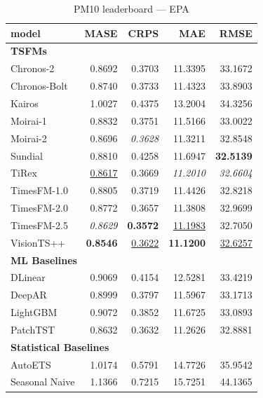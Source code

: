 \begin{table}[H]
\caption{PM10 leaderboard --- EPA}
\centering
\begin{small}
\begin{tabular}{lrrrr}
\toprule
model & MASE & CRPS & MAE & RMSE \\
\midrule
\multicolumn{5}{l}{\textbf{TSFMs}} \\
Chronos-2 & 0.8692 & 0.3703 & 11.3395 & 33.1672 \\
Chronos-Bolt & 0.8740 & 0.3733 & 11.4323 & 33.8903 \\
Kairos & 1.0027 & 0.4375 & 13.2004 & 34.3256 \\
Moirai-1 & 0.8832 & 0.3751 & 11.5166 & 33.0022 \\
Moirai-2 & 0.8696 & \textit{0.3628} & 11.3211 & 32.8548 \\
Sundial & 0.8810 & 0.4258 & 11.6947 & \textbf{32.5139} \\
TiRex & \underline{0.8617} & 0.3669 & \textit{11.2010} & \textit{32.6604} \\
TimesFM-1.0 & 0.8805 & 0.3719 & 11.4426 & 32.8218 \\
TimesFM-2.0 & 0.8772 & 0.3657 & 11.3808 & 32.9699 \\
TimesFM-2.5 & \textit{0.8629} & \textbf{0.3572} & \underline{11.1983} & 32.7050 \\
VisionTS++ & \textbf{0.8546} & \underline{0.3622} & \textbf{11.1200} & \underline{32.6257} \\
\midrule
\multicolumn{5}{l}{\textbf{ML Baselines}} \\
DLinear & 0.9069 & 0.4154 & 12.5281 & 33.4219 \\
DeepAR & 0.8999 & 0.3797 & 11.5967 & 33.1713 \\
LightGBM & 0.9072 & 0.3852 & 11.6725 & 33.0893 \\
PatchTST & 0.8632 & 0.3632 & 11.2626 & 32.8881 \\
\midrule
\multicolumn{5}{l}{\textbf{Statistical Baselines}} \\
AutoETS & 1.0174 & 0.5791 & 14.7726 & 35.9542 \\
Seasonal Naive & 1.1366 & 0.7215 & 15.7251 & 44.1365 \\
\bottomrule
\end{tabular}
\end{small}
\end{table}